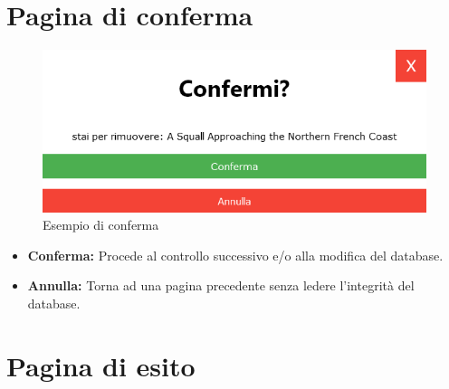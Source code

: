 \documentclass[a4paper, 12pt]{report}
\begin{document}
        \section{Pagina di conferma}
            \begin{figure}[ht]
                \centering
                \includegraphics[scale=0.65]{Immagini/Conferma.png}
                \caption{Esempio di conferma}
            \end{figure}
            \begin{itemize}
                \item \textbf{Conferma:} Procede al controllo successivo e/o alla modifica del database.
                \item \textbf{Annulla:} Torna ad una pagina precedente senza ledere l'integrità del database.
            \end{itemize}
        \clearpage
        \section{Pagina di esito}
\end{document}
